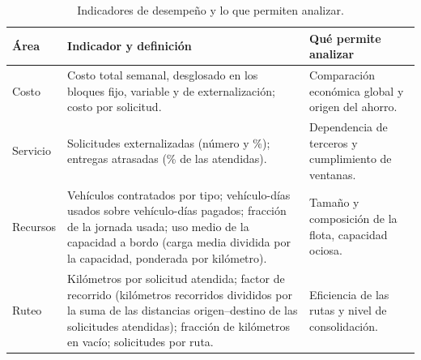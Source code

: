 \begin{table}[htbp]
\centering
\caption{Indicadores de desempeño y lo que permiten analizar.}\label{tab:kpis}
\small
\begin{tabularx}{\textwidth}{lYY}
\toprule
Área & Indicador y definición & Qué permite analizar \\
\midrule
Costo & Costo total semanal, desglosado en los bloques fijo, variable y de externalización; costo por solicitud. & Comparación económica global y origen del ahorro. \\
Servicio & Solicitudes externalizadas (número y \%); entregas atrasadas (\% de las atendidas). & Dependencia de terceros y cumplimiento de ventanas. \\
Recursos & Vehículos contratados por tipo; vehículo-días usados sobre vehículo-días pagados; fracción de la jornada usada; uso medio de la capacidad a bordo (carga media dividida por la capacidad, ponderada por kilómetro). & Tamaño y composición de la flota, capacidad ociosa. \\
Ruteo & Kilómetros por solicitud atendida; factor de recorrido (kilómetros recorridos divididos por la suma de las distancias origen--destino de las solicitudes atendidas); fracción de kilómetros en vacío; solicitudes por ruta. & Eficiencia de las rutas y nivel de consolidación. \\
\bottomrule
\end{tabularx}
\end{table}
